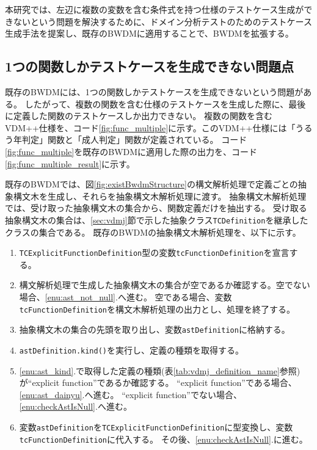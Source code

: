 \documentclass[uplatex, report, a4j, 10pt]{jsbook}
\newcommand\ttt[1]{\texttt{#1}}
\newcommand{\tool}{BWDM}
\begin{document}
本研究では、左辺に複数の変数を含む条件式を持つ仕様のテストケース生成ができないという問題を解決するために、ドメイン分析テストのためのテストケース生成手法を提案し、既存のBWDMに適用することで、BWDMを拡張する。

\subsection{1つの関数しかテストケースを生成できない問題点}\label{sec:probrem_only_function}
既存の\tool{}には、1つの関数しかテストケースを生成できないという問題がある。
したがって、複数の関数を含む仕様のテストケースを生成した際に、最後に定義した関数のテストケースしか出力できない。
複数の関数を含むVDM++仕様を、コード\ref{fig:func_multiple}に示す。このVDM++仕様には「うるう年判定」関数と「成人判定」関数が定義されている。
コード\ref{fig:func_multiple}を既存のBWDMに適用した際の出力を、コード\ref{fig:func_multiple_result}に示す。

既存のBWDMでは、図\ref{fig:existBwdmStructure}の構文解析処理で定義ごとの抽象構文木を生成し、それらを抽象構文木解析処理に渡す。
抽象構文木解析処理では、受け取った抽象構文木の集合から、関数定義だけを抽出する。
受け取る抽象構文木の集合は、\ref{sec:vdmj}節で示した抽象クラス\ttt{TCDefinition}を継承したクラスの集合である。
既存のBWDMの抽象構文木解析処理を、以下に示す。

\newcommand{\TCExplicitFunctionDefinition}{\ttt{TCExplicitFunctionDefinition}}
\newcommand{\tcFunctionDefinition}{\ttt{tcFunctionDefinition}}
\newcommand{\astDefinition}{\ttt{astDefinition}}

\begin{enumerate}
  \item \TCExplicitFunctionDefinition{}型の変数\tcFunctionDefinition{}を宣言する。
  \item\label{enu:checkAstIsNull} 構文解析処理で生成した抽象構文木の集合が空であるか確認する。空でない場合、\ref{enu:ast_not_null}.へ進む。
        空である場合、変数\tcFunctionDefinition{}を構文木解析処理の出力とし、処理を終了する。
  \item\label{enu:ast_not_null} 抽象構文木の集合の先頭を取り出し、変数\astDefinition{}に格納する。
  \item\label{enu:ast_kind} \astDefinition{}\ttt{.kind()}を実行し、定義の種類を取得する。
  \item \ref{enu:ast_kind}.で取得した定義の種類(表\ref{tab:vdmj_definition_name}参照)が``explicit function''であるか確認する。
        ``explicit function''である場合、\ref{enu:ast_dainyu}.へ進む。
        ``explicit function''でない場合、\ref{enu:checkAstIsNull}.へ進む。
  \item\label{enu:ast_dainyu} 変数\astDefinition{}を\TCExplicitFunctionDefinition{}に型変換し、変数\tcFunctionDefinition{}に代入する。
        その後、\ref{enu:checkAstIsNull}.に進む。
\end{enumerate}
\end{document}
